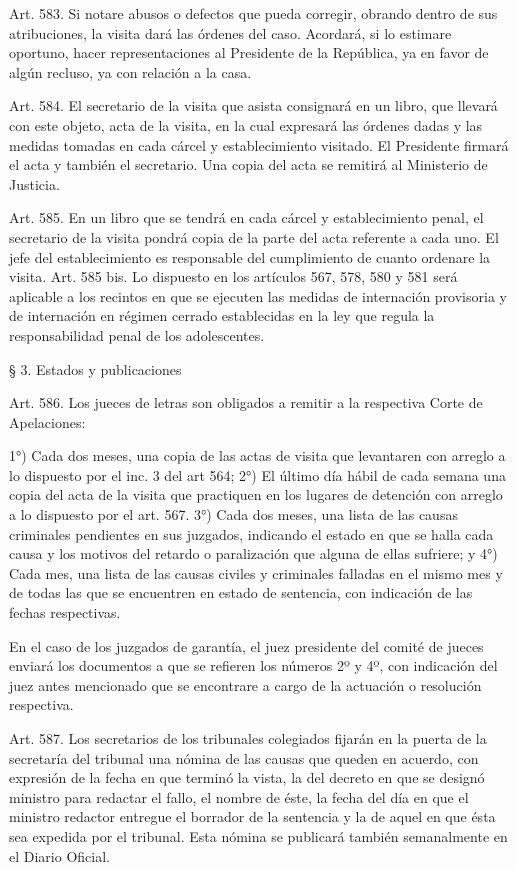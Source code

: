    Art. 583. Si notare abusos o defectos que pueda corregir, obrando dentro de sus atribuciones, la visita dará las órdenes del caso.
    Acordará, si lo estimare oportuno, hacer representaciones al Presidente de la República, ya en favor de algún recluso, ya con relación a la casa.




    Art. 584. El secretario de la visita que asista consignará en un libro, que llevará con este objeto, acta de la visita, en la cual expresará las órdenes dadas y las medidas tomadas en cada cárcel y establecimiento visitado.
    El Presidente firmará el acta y también el secretario.
    Una copia del acta se remitirá al Ministerio de Justicia.


    Art. 585. En un libro que se tendrá en cada cárcel y establecimiento penal, el secretario de la visita pondrá copia de la parte del acta referente a cada uno.
    El jefe del establecimiento es responsable del cumplimiento de cuanto ordenare la visita.
    Art. 585 bis. Lo dispuesto en los artículos 567, 578, 580 y 581 será aplicable a los recintos en que se ejecuten las medidas de internación provisoria y de internación en régimen cerrado establecidas en la ley que regula la responsabilidad penal de los adolescentes.


    § 3. Estados y publicaciones


    Art. 586. Los jueces de letras son obligados a remitir a la respectiva Corte de Apelaciones:

    1°) Cada dos meses, una copia de las actas de visita que levantaren con arreglo a lo dispuesto por el inc. 3 del art 564;
    2°) El último día hábil de cada semana una copia del acta de la visita que practiquen en los lugares de detención con arreglo a lo dispuesto por el art. 567.
    3°) Cada dos meses, una lista de las causas criminales pendientes en sus juzgados, indicando el estado en que se halla cada causa y los motivos del retardo o paralización que alguna de ellas sufriere; y
    4°) Cada mes, una lista de las causas civiles y criminales falladas en el mismo mes y de todas las que se encuentren en estado de sentencia, con indicación de las fechas respectivas.

    En el caso de los juzgados de garantía, el juez presidente del comité de jueces enviará los documentos a que se refieren los números 2º y 4º, con indicación del juez antes mencionado que se encontrare a cargo de la actuación o resolución respectiva.


    Art. 587. Los secretarios de los tribunales colegiados fijarán en la puerta de la secretaría del tribunal una nómina de las causas que queden en acuerdo, con expresión de la fecha en que terminó la vista, la del decreto en que se designó ministro para redactar el fallo, el nombre de éste, la fecha del día en que el ministro redactor entregue el borrador de la sentencia y la de aquel en que ésta sea expedida por el tribunal. Esta nómina se publicará también semanalmente en el Diario Oficial.



